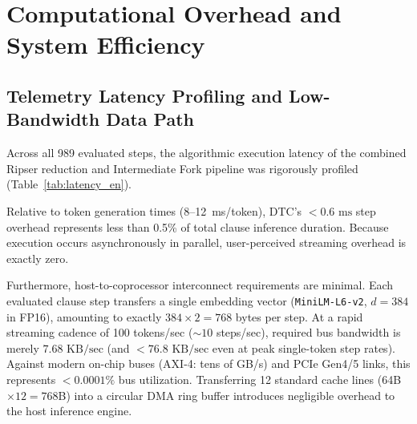 \documentclass[11pt,a4paper]{article}
\begin{document}
\section{Computational Overhead and System Efficiency}

\subsection{Telemetry Latency Profiling and Low-Bandwidth Data Path}

Across all 989 evaluated steps, the algorithmic execution latency of the combined Ripser reduction and Intermediate Fork pipeline was rigorously profiled (Table~\ref{tab:latency_en}).

\begin{table}[htbp]
\centering
\caption{DTC v3.0 algorithmic execution latency profile (989 evaluated steps)}
\label{tab:latency_en}
\small
{}
\end{table}

Relative to token generation times (8--12~ms/token), DTC's $<0.6\text{ ms}$ step overhead represents less than 0.5\% of total clause inference duration. Because execution occurs asynchronously in parallel, user-perceived streaming overhead is exactly zero.

Furthermore, host-to-coprocessor interconnect requirements are minimal. Each evaluated clause step transfers a single embedding vector (\texttt{MiniLM-L6-v2}, $d=384$ in FP16), amounting to exactly $384 \times 2 = 768$ bytes per step. At a rapid streaming cadence of 100 tokens/sec ($\sim 10$ steps/sec), required bus bandwidth is merely $7.68\text{ KB/sec}$ (and $<76.8\text{ KB/sec}$ even at peak single-token step rates). Against modern on-chip buses (AXI-4: tens of GB/s) and PCIe Gen4/5 links, this represents $<0.0001\%$ bus utilization. Transferring 12 standard cache lines (64B $\times 12 = 768$B) into a circular DMA ring buffer introduces negligible overhead to the host inference engine.
\end{document}

